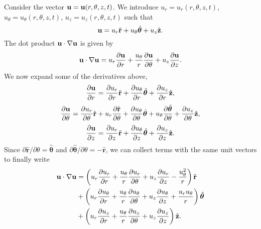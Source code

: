 \documentclass[11pt]{article}
\newcommand{\boldrhat}{\hat{\mathbf{r}}}
\newcommand{\boldthetahat}{\hat{\boldsymbol{\theta}}}
\begin{document}
Consider the vector $\mathbf{u} = \mathbf{u}(r, \theta, z, t)$. We introduce $u_r = u_r(r, \theta, z, t)$, $u_\theta = u_\theta(r, \theta, z, t)$, $u_z = u_z(r, \theta, z, t)$ such that 
\begin{equation}
    \uvec = u_r \boldrhat + u_\theta \boldthetahat + u_z \hat{\zvec}.
\end{equation}
The dot product $\mathbf{u} \cdot \nabla \mathbf{u}$ is given by
\begin{equation}
    \mathbf{u} \cdot \nabla \mathbf{u} = u_r \frac{\partial \mathbf{u}}{\partial r} + \frac{u_\theta}{r} \frac{\partial \mathbf{u}}{\partial \theta} + u_z \frac{\partial \mathbf{u}}{\partial z}.
\end{equation}
We now expand some of the derivatives above,
\begin{equation}
    \frac{\partial \uvec}{\partial r} = \frac{\partial u_r}{\partial r} \boldrhat + \frac{\partial u_\theta}{\partial r} \boldthetahat + \frac{\partial u_z}{\partial r} \hat{\zvec},
\end{equation}
\begin{equation}
    \frac{\partial \uvec}{\partial \theta} = \frac{\partial u_r}{\partial \theta} \boldrhat + u_r\frac{\partial \boldrhat}{\partial \theta} + \frac{\partial u_\theta}{\partial \theta} \boldthetahat + u_\theta \frac{\partial \boldthetahat}{\partial \theta} + \frac{\partial u_z}{\partial \theta} \hat{\zvec},
\end{equation}
\begin{equation}
    \frac{\partial \uvec}{\partial z} = \frac{\partial u_r}{\partial z} \boldrhat + \frac{\partial u_\theta}{\partial z} \boldthetahat + \frac{\partial u_z}{\partial z} \hat{\zvec}.
\end{equation}
Since $\partial \boldrhat / \partial \theta = \boldthetahat$ and $\partial \boldthetahat / \partial \theta = -\boldrhat$, we can collect terms with the same unit vectors to finally write
\begin{align}
    \uvec \cdot \nabla \uvec &= \left( u_r \frac{\partial u_r}{\partial r} + \frac{u_\theta}{r} \frac{\partial u_r}{\partial \theta} + u_z \frac{\partial u_r}{\partial z} - \frac{u_\theta^2}{r} \right) \boldrhat \\
    &+ \left( u_r \frac{\partial u_\theta}{\partial r} + \frac{u_\theta}{r} \frac{\partial u_\theta}{\partial \theta} + u_z \frac{\partial u_\theta}{\partial z} + \frac{u_r u_\theta}{r} \right) \boldthetahat \\
    &+ \left( u_r \frac{\partial u_z}{\partial r} + \frac{u_\theta}{r} \frac{\partial u_z}{\partial \theta} + u_z \frac{\partial u_z}{\partial z} \right) \hat{\zvec}.
\end{align}
\end{document}
